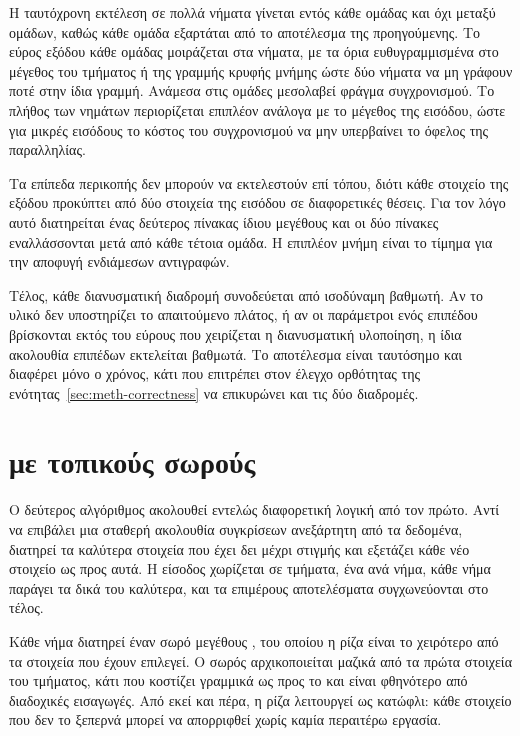 Η ταυτόχρονη εκτέλεση σε πολλά νήματα γίνεται εντός κάθε ομάδας και όχι μεταξύ
ομάδων, καθώς κάθε ομάδα εξαρτάται από το αποτέλεσμα της προηγούμενης. Το εύρος
εξόδου κάθε ομάδας μοιράζεται στα νήματα, με τα όρια ευθυγραμμισμένα στο μέγεθος
του τμήματος ή της γραμμής κρυφής μνήμης ώστε δύο νήματα να μη γράφουν ποτέ στην
ίδια γραμμή. Ανάμεσα στις ομάδες μεσολαβεί φράγμα συγχρονισμού. Το πλήθος των
νημάτων περιορίζεται επιπλέον ανάλογα με το μέγεθος της εισόδου, ώστε για μικρές
εισόδους το κόστος του συγχρονισμού να μην υπερβαίνει το όφελος της
παραλληλίας.

Τα επίπεδα περικοπής δεν μπορούν να εκτελεστούν επί τόπου, διότι κάθε στοιχείο
της εξόδου προκύπτει από δύο στοιχεία της εισόδου σε διαφορετικές θέσεις. Για
τον λόγο αυτό διατηρείται ένας δεύτερος πίνακας ίδιου μεγέθους και οι δύο
πίνακες εναλλάσσονται μετά από κάθε τέτοια ομάδα. Η επιπλέον μνήμη είναι το
τίμημα για την αποφυγή ενδιάμεσων αντιγραφών.

Τέλος, κάθε διανυσματική διαδρομή συνοδεύεται από ισοδύναμη βαθμωτή. Αν το υλικό
δεν υποστηρίζει το απαιτούμενο πλάτος, ή αν οι παράμετροι ενός επιπέδου
βρίσκονται εκτός του εύρους που χειρίζεται η διανυσματική υλοποίηση, η ίδια
ακολουθία επιπέδων εκτελείται βαθμωτά. Το αποτέλεσμα είναι ταυτόσημο και
διαφέρει μόνο ο χρόνος, κάτι που επιτρέπει στον έλεγχο ορθότητας της
ενότητας~\ref{sec:meth-correctness} να επικυρώνει και τις δύο διαδρομές.

\section{ με τοπικούς σωρούς}
\label{sec:cpu-mapreduce}

Ο δεύτερος αλγόριθμος ακολουθεί εντελώς διαφορετική λογική από τον πρώτο. Αντί
να επιβάλει μια σταθερή ακολουθία συγκρίσεων ανεξάρτητη από τα δεδομένα,
διατηρεί τα  καλύτερα στοιχεία που έχει δει μέχρι στιγμής και εξετάζει
κάθε νέο στοιχείο ως προς αυτά. Η είσοδος χωρίζεται σε τμήματα, ένα ανά νήμα,
κάθε νήμα παράγει τα δικά του  καλύτερα, και τα επιμέρους αποτελέσματα
συγχωνεύονται στο τέλος.

Κάθε νήμα διατηρεί έναν σωρό μεγέθους , του οποίου η ρίζα είναι το
χειρότερο από τα  στοιχεία που έχουν επιλεγεί. Ο σωρός αρχικοποιείται
μαζικά από τα πρώτα  στοιχεία του τμήματος, κάτι που κοστίζει γραμμικά ως
προς το  και είναι φθηνότερο από  διαδοχικές εισαγωγές. Από εκεί και
πέρα, η ρίζα λειτουργεί ως κατώφλι: κάθε στοιχείο που δεν το ξεπερνά μπορεί να
απορριφθεί χωρίς καμία περαιτέρω εργασία.

